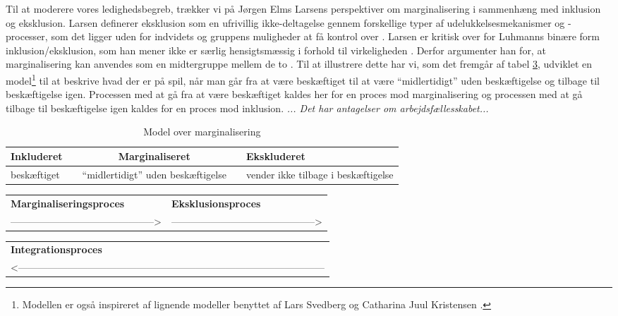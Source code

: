 Til at moderere vores ledighedsbegreb, trækker vi på Jørgen Elms Larsens perspektiver om  marginalisering i sammenhæng med inklusion og eksklusion. Larsen definerer eksklusion som en ufrivillig ikke-deltagelse gennem forskellige typer af udelukkelsesmekanismer og -processer, som det ligger uden for indvidets og gruppens muligheder at få kontrol over \parencite[237]{Larsen2009}. Larsen er kritisk over for Luhmanns binære form inklusion/eksklusion, som han mener ikke er særlig hensigtsmæssig i forhold til virkeligheden \parencite[?]{Larsen2009}. Derfor argumenter han for, at marginalisering kan anvendes som en midtergruppe mellem de to \parencite[130f]{Larsen2009}. Til at illustrere dette har vi, som det fremgår af tabel \ref{tab_marginaliseringsmodel}, udviklet en model\footnote{Modellen er også inspireret af lignende modeller benyttet af Lars Svedberg \parencite[44]{Svedberg1995} og Catharina Juul Kristensen \parencite[18]{Kristensen1999}.} til at beskrive hvad der er på spil, når man går fra at være beskæftiget til at være “midlertidigt” uden beskæftigelse og tilbage til beskæftigelse igen. Processen med at gå fra at være beskæftiget kaldes her for en proces mod marginalisering og processen med at gå tilbage til beskæftigelse igen kaldes for en proces mod inklusion. \emph{... Det har antagelser om arbejdsfællesskabet...}
%
\begin{table}[H] \centering
\caption{Model over marginalisering}
\label{tab_marginaliseringsmodel}
\begin{tabular}{@{} m{} c m{4cm} c m{4cm} @{}} \toprule
\textbf{Inkluderet} & & \multicolumn{1}{c}{\textbf{Marginaliseret}} & & \textbf{Ekskluderet} \\ \midrule
  beskæftiget  & & “midlertidigt” uden beskæftigelse & & vender ikke tilbage i beskæftigelse \\  
\end{tabular} \end{table}
%
\begin{table}[H] \centering
\label{tab_marginaliseringsmodel}
\begin{tabular}{@{} m{} m{} @{}} 
  \textbf{Marginaliseringsproces} & \textbf{Eksklusionsproces} \\  
  --------------------------------------------> & --------------------------------------------> \\ 
\end{tabular} \end{table}
%
%
\begin{table}[H] \centering
\label{tab_marginaliseringsmodel}
\begin{tabular}{@{} m{} @{}} 
  \textbf{Integrationsproces} \\  
  <--------------------------------------------------------------------------------------------- \\ \bottomrule
\end{tabular} \end{table}
